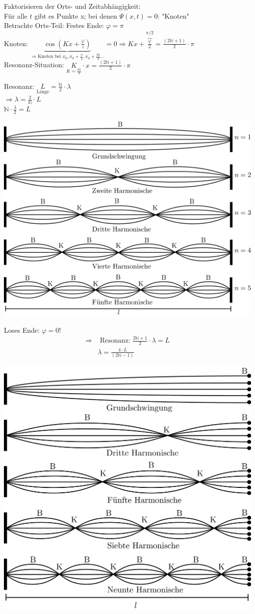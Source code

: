Faktorisieren der Orts- und Zeitabhängigkeit:\\
Für alle $ t $ gibt es Punkte x; bei denen  $ \Psi(x,t) = 0 $: "Knoten"\\
Betrachte Orts-Teil: Festes Ende: $ \varphi = \pi $\\
Knoten: $ \underbrace{\cos(Kx+\frac{\varphi}{z})}_{\Rightarrow \text{Knoten bei } x_0, x_0+\frac{\pi}{2}, x_0+\frac{3\pi}{2}...} = 0 \Rightarrow Kx+\overbrace{\frac{\varphi}{2}}^{\pi/2}= \frac{(2\mathbb{N}+1)}{2} \cdot \pi $\\ \break
Resonanz-Situation: $  \underset{K=\frac{2\pi}{2}}{K} \cdot x = \frac{(2\mathbb{N}+1)}{2} \cdot \pi $\\
\begin{center}
	Resonanz: $ \underset{\text{Länge}}{L} = \frac{\mathbb{N}}{2} \cdot \lambda $\\
\underline{$ \Rightarrow \lambda = \frac{2}{\mathbb{N}}\cdot L $}\\
\underline{$ \mathbb{N}\cdot\frac{\lambda}{2} = L $}\\
\end{center}
\begin{center}
	\includegraphics[width=0.7\linewidth]{skizzen/19/19B14}
\end{center}
 Loses Ende: $ \varphi = 0 $!
 \begin{align*}
 \Rightarrow &\text{ Resonanz: } \frac{2\mathbb{N}+1}{2} \cdot \lambda = L\\
 &\lambda = \frac{4 \cdot L}{(2\mathbb{N}-1)}
 \end{align*}
\begin{center}
	\includegraphics[width=0.7\linewidth]{skizzen/19/19B15}
\end{center}
